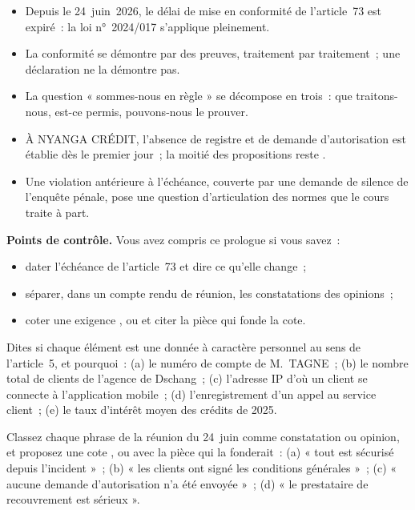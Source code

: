 \begin{boxresume}
\begin{itemize}
    \item Depuis le 24~juin~2026, le délai de mise en conformité de
          l'article~73 est expiré~: la loi n°~2024/017 s'applique
          pleinement.
    \item La conformité se démontre par des preuves, traitement par
          traitement~; une déclaration ne la démontre pas.
    \item La question « sommes-nous en règle » se décompose en trois~: que
          traitons-nous, est-ce permis, pouvons-nous le prouver.
    \item À NYANGA CRÉDIT, l'absence de registre et de demande
          d'autorisation est établie dès le premier jour~; la moitié des
          propositions reste \NEK{}.
    \item Une violation antérieure à l'échéance, couverte par une demande de
          silence de l'enquête pénale, pose une question d'articulation des
          normes que le cours traite à part.
\end{itemize}
\end{boxresume}

\begin{boxinfo}
\textbf{Points de contrôle.} Vous avez compris ce prologue si vous savez~:
\begin{itemize}
    \item dater l'échéance de l'article~73 et dire ce qu'elle change~;
    \item séparer, dans un compte rendu de réunion, les constatations des
          opinions~;
    \item coter une exigence \OUI{}, \NON{} ou \NEK{} et citer la pièce qui
          fonde la cote.
\end{itemize}
\end{boxinfo}

\begin{boxexo}[title={\ding{45}\quad Exercice~0.1. Donnée personnelle ou non \niveaubase}]
Dites si chaque élément est une donnée à caractère personnel au sens de
l'article~5, et pourquoi~: (a) le numéro de compte de M.~TAGNE~; (b) le
nombre total de clients de l'agence de Dschang~; (c) l'adresse IP d'où un
client se connecte à l'application mobile~; (d) l'enregistrement d'un appel
au service client~; (e) le taux d'intérêt moyen des crédits de 2025.
\end{boxexo}

\begin{boxexo}[title={\ding{45}\quad Exercice~0.2. Constatation ou opinion \niveaumoyen}]
Classez chaque phrase de la réunion du 24~juin comme constatation ou
opinion, et proposez une cote \OUI{}, \NON{} ou \NEK{} avec la pièce qui la
fonderait~: (a) « tout est sécurisé depuis l'incident »~; (b) « les clients
ont signé les conditions générales »~; (c) « aucune demande d'autorisation
n'a été envoyée »~; (d) « le prestataire de recouvrement est sérieux ».
\end{boxexo}

